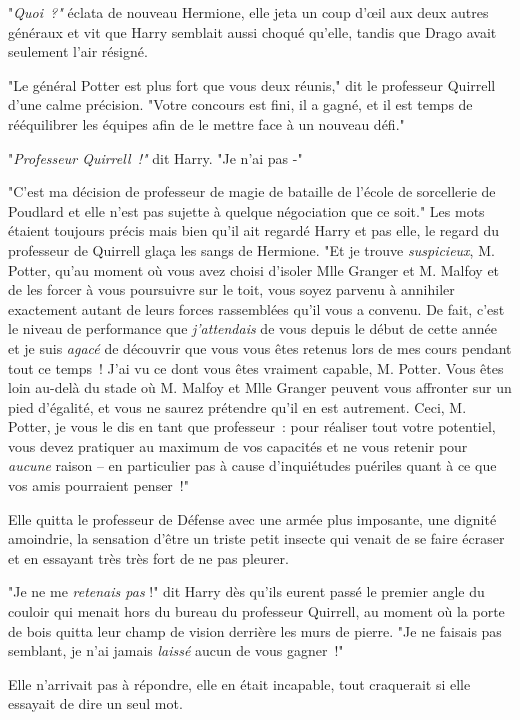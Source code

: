 "\emph{Quoi~?"} éclata de nouveau Hermione, elle jeta un coup d'œil aux deux autres généraux et vit que Harry semblait aussi choqué qu'elle, tandis que Drago avait seulement l'air résigné.

"Le général Potter est plus fort que vous deux réunis," dit le professeur Quirrell d'une calme précision. "Votre concours est fini, il a gagné, et il est temps de rééquilibrer les équipes afin de le mettre face à un nouveau défi."

"\emph{Professeur Quirrell~!"} dit Harry. "Je n'ai pas -"

"C'est ma décision de professeur de magie de bataille de l'école de sorcellerie de Poudlard et elle n'est pas sujette à quelque négociation que ce soit." Les mots étaient toujours précis mais bien qu'il ait regardé Harry et pas elle, le regard du professeur de Quirrell glaça les sangs de Hermione. "Et je trouve \emph{suspicieux}, M. Potter, qu'au moment où vous avez choisi d'isoler Mlle Granger et M. Malfoy et de les forcer à vous poursuivre sur le toit, vous soyez parvenu à annihiler exactement autant de leurs forces rassemblées qu'il vous a convenu. De fait, c'est le niveau de performance que \emph{j'attendais} de vous depuis le début de cette année et je suis \emph{agacé} de découvrir que vous vous êtes retenus lors de mes cours pendant tout ce temps~! J'ai vu ce dont vous êtes vraiment capable, M. Potter. Vous êtes loin au-delà du stade où M. Malfoy et Mlle Granger peuvent vous affronter sur un pied d'égalité, et vous ne saurez prétendre qu'il en est autrement. Ceci, M. Potter, je vous le dis en tant que professeur~: pour réaliser tout votre potentiel, vous devez pratiquer au maximum de vos capacités et ne vous retenir pour \emph{aucune} raison -- en particulier pas à cause d'inquiétudes puériles quant à ce que vos amis pourraient penser~!"

\later

Elle quitta le professeur de Défense avec une armée plus imposante, une dignité amoindrie, la sensation d'être un triste petit insecte qui venait de se faire écraser et en essayant très très fort de ne pas pleurer.

"Je ne me \emph{retenais pas} !" dit Harry dès qu'ils eurent passé le premier angle du couloir qui menait hors du bureau du professeur Quirrell, au moment où la porte de bois quitta leur champ de vision derrière les murs de pierre. "Je ne faisais pas semblant, je n'ai jamais \emph{laissé} aucun de vous gagner~!"

Elle n'arrivait pas à répondre, elle en était incapable, tout craquerait si elle essayait de dire un seul mot.

